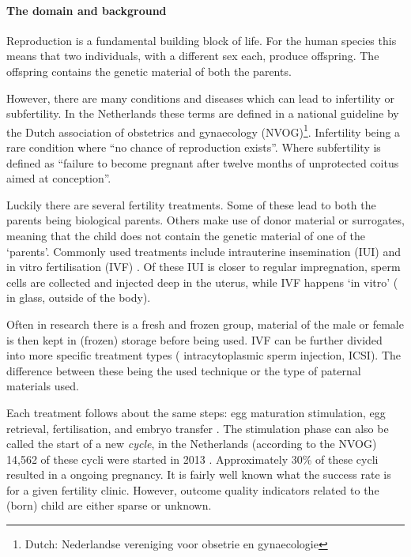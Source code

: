
\paragraph{The domain and background}
Reproduction is a fundamental building block of life.
For the human species this means that two individuals, with a different sex each, produce offspring.
The offspring contains the genetic material of both the parents.

However, there are many conditions and diseases which can lead to infertility or subfertility.
In the Netherlands these terms are defined in a national guideline by the Dutch association of obstetrics and gynaecology (NVOG)\footnote{Dutch: Nederlandse vereniging voor obsetrie en gynaecologie}\cite{subfertilityGuideline}.
Infertility being a rare condition where ``no chance of reproduction exists''.
Where subfertility is defined as ``failure to become pregnant after twelve months of unprotected coitus aimed at conception''.

Luckily there are several fertility treatments.
Some of these lead to both the parents being biological parents. 
Others make use of donor material or surrogates, meaning that the child does not contain the genetic material of one of the `parents'.
Commonly used treatments include intrauterine insemination (IUI) and in vitro fertilisation (IVF) \cite{treatmentExplanation}.
Of these IUI is closer to regular impregnation, sperm cells are collected and injected deep in the uterus, while IVF happens `in vitro' (\ie{} in glass, outside of the body).

Often in research there is a fresh and frozen group, material of the male or female is then kept in (frozen) storage before being used.
IVF can be further divided into more specific treatment types (\eg{} intracytoplasmic sperm injection, ICSI).
The difference between these being the used technique or the type of paternal materials used.

Each treatment follows about the same steps: egg maturation stimulation, egg retrieval, fertilisation, and embryo transfer \cite{treatmentExplanation}.
The stimulation phase can also be called the start of a new \emph{cycle}, in the Netherlands (according to the NVOG) 14,562 of these cycli were started in 2013 \cite{ivfReportNVOG2013}.
Approximately 30\% of these cycli resulted in a ongoing pregnancy.
It is fairly well known what the success rate is for a given fertility clinic.
However, outcome quality indicators related to the (born) child are either sparse or unknown.

